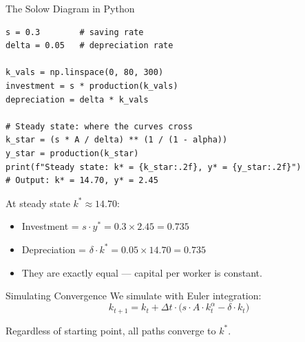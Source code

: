 \documentclass[aspectratio=169, 10pt]{beamer}
\begin{document}
\begin{frame}[fragile]{The Solow Diagram in Python}
\begin{lstlisting}
s = 0.3        # saving rate
delta = 0.05   # depreciation rate

k_vals = np.linspace(0, 80, 300)
investment = s * production(k_vals)
depreciation = delta * k_vals

# Steady state: where the curves cross
k_star = (s * A / delta) ** (1 / (1 - alpha))
y_star = production(k_star)
print(f"Steady state: k* = {k_star:.2f}, y* = {y_star:.2f}")
# Output: k* = 14.70, y* = 2.45
\end{lstlisting}
\vspace{0.3em}
At steady state $k^* \approx 14.70$:
\begin{itemize}
  \item Investment = $s \cdot y^* = 0.3 \times 2.45 = 0.735$
  \item Depreciation = $\delta \cdot k^* = 0.05 \times 14.70 = 0.735$
  \item They are \alert{exactly equal} --- capital per worker is constant.
\end{itemize}
\end{frame}

\begin{frame}{Simulating Convergence}
We simulate with Euler integration:
\[
  k_{t+1} = k_t + \Delta t \cdot \bigl(s \cdot A \cdot k_t^{\alpha} - \delta \cdot k_t\bigr)
\]
\begin{center}
\end{center}
Regardless of starting point, all paths converge to $k^*$.
\end{frame}
\end{document}
